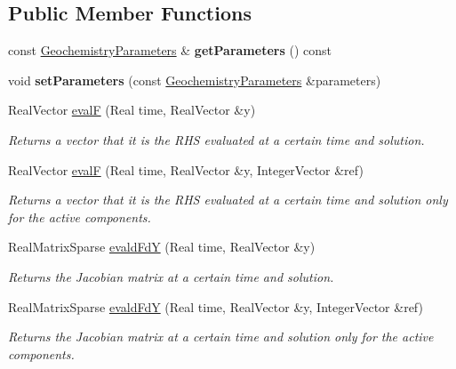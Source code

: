 \subsection*{Public Member Functions}
\begin{DoxyCompactItemize}
\item 
\hypertarget{classGeochemistryRHSFunction_ab2a3ed2ba939f826922a540bfea66170}{
const \hyperlink{classGeochemistryParameters}{GeochemistryParameters} \& {\bfseries getParameters} () const }
\label{classGeochemistryRHSFunction_ab2a3ed2ba939f826922a540bfea66170}

\item 
\hypertarget{classGeochemistryRHSFunction_ad13a354a864092c722abdf5a28daa5f6}{
void {\bfseries setParameters} (const \hyperlink{classGeochemistryParameters}{GeochemistryParameters} \&parameters)}
\label{classGeochemistryRHSFunction_ad13a354a864092c722abdf5a28daa5f6}

\item 
RealVector \hyperlink{classGeochemistryRHSFunction_a2f7125c7c0ae977aea796acc9ea63e82}{evalF} (Real time, RealVector \&y)
\begin{DoxyCompactList}\small\item\em Returns a vector that it is the RHS evaluated at a certain time and solution. \item\end{DoxyCompactList}\item 
RealVector \hyperlink{classGeochemistryRHSFunction_a55eef411737aff551702c1a56d9673a1}{evalF} (Real time, RealVector \&y, IntegerVector \&ref)
\begin{DoxyCompactList}\small\item\em Returns a vector that it is the RHS evaluated at a certain time and solution only for the active components. \item\end{DoxyCompactList}\item 
RealMatrixSparse \hyperlink{classGeochemistryRHSFunction_a851506d3afa8a261a69e88421239b5e8}{evaldFdY} (Real time, RealVector \&y)
\begin{DoxyCompactList}\small\item\em Returns the Jacobian matrix at a certain time and solution. \item\end{DoxyCompactList}\item 
RealMatrixSparse \hyperlink{classGeochemistryRHSFunction_a87772d1a56b1bfe204b899dc14c44ad1}{evaldFdY} (Real time, RealVector \&y, IntegerVector \&ref)
\begin{DoxyCompactList}\small\item\em Returns the Jacobian matrix at a certain time and solution only for the active components. \item\end{DoxyCompactList}\end{DoxyCompactItemize}



